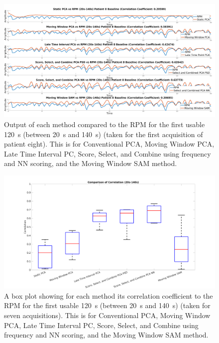             \begin{figure}
                \centering
                
                \includegraphics[width=1.0\linewidth]{figures/data_driven_surrogate_signal_extraction_methods_1_patient_eight_output.png}
                
                \captionsetup{singlelinecheck=false}
                \caption{
                    Output of each method compared to the \gls{RPM} for the first usable \SI{120}{\second} (between \SI{20}{\second} and \SI{140}{\second}) (taken for the first acquisition of patient eight). This is for Conventional \gls{PCA}, Moving Window \gls{PCA}, Late Time Interval \gls{PC}, Score, Select, and Combine using frequency and \gls{NN} scoring, and the Moving Window \gls{SAM} method.
                }
                \label{fig:patient_eight_output}
            \end{figure}
        
            \begin{figure}
                \centering
                
                \includegraphics[width=1.0\linewidth]{figures/data_driven_surrogate_signal_extraction_methods_1_box_plot_early.png}
                
                \captionsetup{singlelinecheck=false}
                \caption{
                    A box plot showing for each method its correlation coefficient to the \gls{RPM} for the first usable \SI{120}{\second} (between \SI{20}{\second} and \SI{140}{\second}) (taken for seven acquisitions). This is for Conventional \gls{PCA}, Moving Window \gls{PCA}, Late Time Interval \gls{PC}, Score, Select, and Combine using frequency and \gls{NN} scoring, and the Moving Window \gls{SAM} method.
                }
                \label{fig:box_plot_early}
            \end{figure}
        
